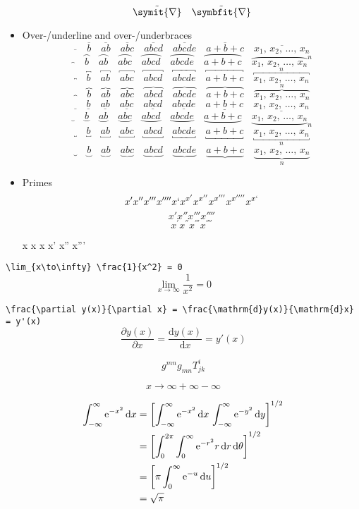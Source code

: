 \documentclass{article}
\def\OVERUNDERLINE#1{%
  #1{} \quad #1{b} \quad #1{ab} \quad #1{abc} \quad #1{abcd} \quad #1{abcde} \quad #1{a+b+c}}
\def\LISTTEXT{x_1, \, x_2, \, \ldots, \, x_n}
\begin{document}
\begin{itemize}
\[          \tilde{\symit{\nabla}} \quad \tilde{\symbfit{\nabla}}
        \]
  \item Over-/underline and over-/underbraces
        \[ \OVERUNDERLINE{\overline}     \quad \overline     {\LISTTEXT}   \]
        \[ \OVERUNDERLINE{\overparen}    \quad \overparen    {\LISTTEXT}^n \]
        \[ \OVERUNDERLINE{\overbracket}  \quad \overbracket  {\LISTTEXT}^n \]
        \[ \OVERUNDERLINE{\overbrace}    \quad \overbrace    {\LISTTEXT}^n \]
        \[ \OVERUNDERLINE{\underline}    \quad \underline    {\LISTTEXT}   \]
        \[ \OVERUNDERLINE{\underparen}   \quad \underparen   {\LISTTEXT}_n \]
        \[ \OVERUNDERLINE{\underbracket} \quad \underbracket {\LISTTEXT}_n \]
        \[ \OVERUNDERLINE{\underbrace}   \quad \underbrace   {\LISTTEXT}_n \]
  \item Primes
        \[ x' x'' x''' x'''' x` x^{x'} x^{x''} x^{x'''} x^{x''''} x^{x`} \]
        \[ x \prime x \dprime x \trprime x \qprime \]
        \[ x^{\prime} x^{\dprime} x^{\trprime} x^{\qprime} \] %
        \begin{center}
          \firatext x x x x' x'' x'''
        \end{center}
\end{itemize}

\verb|\lim_{x\to\infty} \frac{1}{x^2} = 0|
\[ \lim_{x\to\infty} \frac{1}{x^2} = 0 \]

\verb|\frac{\partial y(x)}{\partial x} = \frac{\mathrm{d}y(x)}{\mathrm{d}x} = y'(x)|
\[ \frac{\partial y(x)}{\partial x} = \frac{\mathrm{d}y(x)}{\mathrm{d}x} = y'(x) \]

\[ g^{mn} g_{mn} T^{i}_{jk} \]

\[ x \to \infty + \infty - \infty \]

\def\ee{\mathrm{e}}
\begin{align*}
     \int_{-\infty}^\infty \ee^{-x^2} \dd{x}
  &= \qty[\int_{-\infty}^\infty \ee^{-x^2} \dd{x} \, \int_{-\infty}^\infty \ee^{-y^2} \dd{y}]^{1/2} \\
  &= \qty[\int_0^{2\pi} \int_0^\infty \ee^{-r^2} r \dd{r}\dd{\theta}]^{1/2} \\
  &= \qty[\pi \int_0^\infty \ee^{-u} \dd{u}]^{1/2} \\
  &= \sqrt{\pi}
\end{align*}
\end{document}
